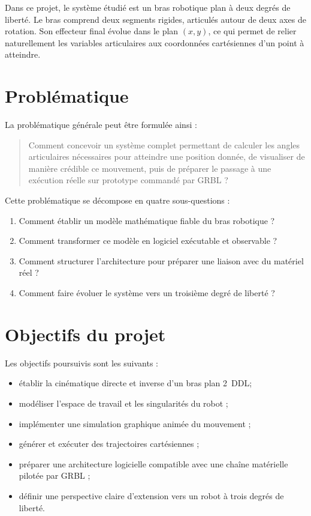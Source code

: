 \documentclass[12pt,a4paper]{report}
\newcommand{\ddof}{2~DDL}
\newcommand{\workspace}{espace de travail}
\begin{document}
Dans ce projet, le système étudié est un bras robotique plan à deux degrés de liberté.
Le bras comprend deux segments rigides, articulés autour de deux axes de rotation. Son
effecteur final évolue dans le plan $(x,y)$, ce qui permet de relier naturellement les
variables articulaires aux coordonnées cartésiennes d'un point à atteindre.

\section{Problématique}

La problématique générale peut être formulée ainsi :

\begin{quote}
Comment concevoir un système complet permettant de calculer les angles articulaires
nécessaires pour atteindre une position donnée, de visualiser de manière crédible ce
mouvement, puis de préparer le passage à une exécution réelle sur prototype commandé
par GRBL ?
\end{quote}

Cette problématique se décompose en quatre sous-questions :

\begin{enumerate}[label=\arabic*.]
    \item Comment établir un modèle mathématique fiable du bras robotique ?
    \item Comment transformer ce modèle en logiciel exécutable et observable ?
    \item Comment structurer l'architecture pour préparer une liaison avec du matériel réel ?
    \item Comment faire évoluer le système vers un troisième degré de liberté ?
\end{enumerate}

\section{Objectifs du projet}

Les objectifs poursuivis sont les suivants :

\begin{itemize}
    \item établir la cinématique directe et inverse d'un bras plan \ddof ;
    \item modéliser l'\workspace{} et les singularités du robot ;
    \item implémenter une simulation graphique animée du mouvement ;
    \item générer et exécuter des trajectoires cartésiennes ;
    \item préparer une architecture logicielle compatible avec une chaîne matérielle pilotée par GRBL ;
    \item définir une perspective claire d'extension vers un robot à trois degrés de liberté.
\end{itemize}
\end{document}

